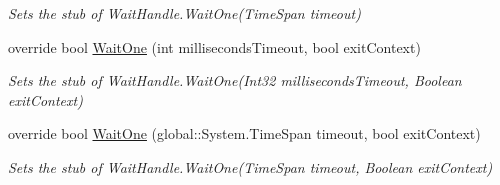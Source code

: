 \begin{DoxyCompactItemize}
\begin{DoxyCompactList}\small\item\em Sets the stub of Wait\-Handle.\-Wait\-One(\-Time\-Span timeout)\end{DoxyCompactList}\item 
override bool \hyperlink{class_system_1_1_threading_1_1_fakes_1_1_stub_wait_handle_a19ad0bab9c92bf72a885a83b90ff5408}{Wait\-One} (int milliseconds\-Timeout, bool exit\-Context)
\begin{DoxyCompactList}\small\item\em Sets the stub of Wait\-Handle.\-Wait\-One(\-Int32 milliseconds\-Timeout, Boolean exit\-Context)\end{DoxyCompactList}\item 
override bool \hyperlink{class_system_1_1_threading_1_1_fakes_1_1_stub_wait_handle_a56c3bca655cc851b5e4c2abbc59b6435}{Wait\-One} (global\-::\-System.\-Time\-Span timeout, bool exit\-Context)
\begin{DoxyCompactList}\small\item\em Sets the stub of Wait\-Handle.\-Wait\-One(\-Time\-Span timeout, Boolean exit\-Context)\end{DoxyCompactList}\end{DoxyCompactItemize}
